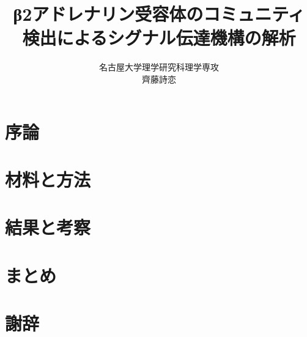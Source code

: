 \documentclass[a4paper, 14pt]{ltjsreport}
\title{β2アドレナリン受容体のコミュニティ検出によるシグナル伝達機構の解析}
\author{名古屋大学理学研究科理学専攻\\齊藤詩恋}
\begin{document}
%

\tableofcontents
\clearpage

\chapter{序論}


\chapter{材料と方法}


\chapter{結果と考察}\label{chap:results}


\chapter{まとめ}


\chapter*{謝辞}


\printbibliography[title=参考文献]
\end{document}
